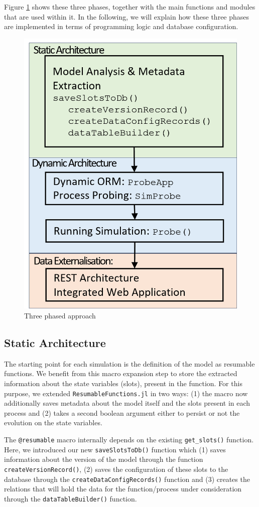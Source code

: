 \documentclass{juliacon}
\begin{document}
Figure \ref{fig:threePhase} shows these three phases, together with the main functions and modules that are used within it. In the following, we will explain how these three phases are implemented in terms of programming logic and database configuration.

\begin{figure}[th]
	\centering
	\includegraphics[width=0.6\linewidth]{images/threePhase}
	\caption{Three phased approach}
	\label{fig:threePhase}
\end{figure}

\subsection{Static Architecture}\label{statArch}

The starting point for each simulation is the definition of the model as resumable functions. We benefit from this macro expansion step to store the extracted information about the state variables (slots), present in the function. For this purpose, we extended \texttt{ResumableFunctions.jl} in two ways: (1) the macro now additionally saves metadata about the model itself and the slots present in each process and (2) takes a second boolean argument either to persist or not the evolution on the state variables. %

\vskip 6pt

The \texttt{@resumable} macro internally depends on the existing \texttt{get\_slots()} function. Here, we introduced our new \texttt{saveSlotsToDb()} function which (1) saves information about the version of the model through the function \texttt{createVersionRecord()}, (2) saves the configuration of these slots to the database through the \texttt{createDataConfigRecords()} function and (3) creates the relations that will hold the data for the function/process under consideration through the \texttt{dataTableBuilder()} function. \vskip 6pt
\end{document}
